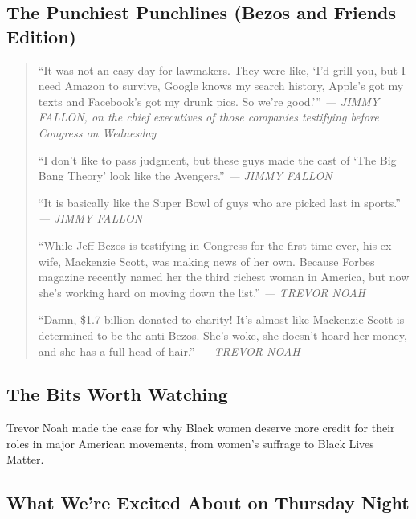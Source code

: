 \hypertarget{the-punchiest-punchlines-bezos-and-friends-edition}{%
\subsection{The Punchiest Punchlines (Bezos and Friends
Edition)}\label{the-punchiest-punchlines-bezos-and-friends-edition}}

\begin{quote}
``It was not an easy day for lawmakers. They were like, `I'd grill you,
but I need Amazon to survive, Google knows my search history, Apple's
got my texts and Facebook's got my drunk pics. So we're good.'''
\emph{--- JIMMY FALLON, on the chief executives of those companies
testifying before Congress on Wednesday}

``I don't like to pass judgment, but these guys made the cast of `The
Big Bang Theory' look like the Avengers.'' \emph{--- JIMMY FALLON}

``It is basically like the Super Bowl of guys who are picked last in
sports.'' \emph{--- JIMMY FALLON}

``While Jeff Bezos is testifying in Congress for the first time ever,
his ex-wife, Mackenzie Scott, was making news of her own. Because Forbes
magazine recently named her the third richest woman in America, but now
she's working hard on moving down the list.'' \emph{--- TREVOR NOAH}

``Damn, \$1.7 billion donated to charity! It's almost like Mackenzie
Scott is determined to be the anti-Bezos. She's woke, she doesn't hoard
her money, and she has a full head of hair.'' \emph{--- TREVOR NOAH}
\end{quote}

\hypertarget{the-bits-worth-watching}{%
\subsection{The Bits Worth Watching}\label{the-bits-worth-watching}}

Trevor Noah made the case for why Black women deserve more credit for
their roles in major American movements, from women's suffrage to Black
Lives Matter.

\hypertarget{what-were-excited-about-on-thursday-night}{%
\subsection{What We're Excited About on Thursday
Night}\label{what-were-excited-about-on-thursday-night}}

